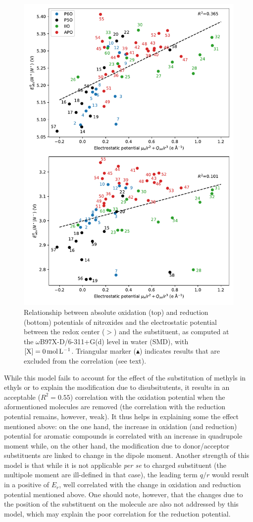 \documentclass[review]{elsarticle}
\begin{document}
\begin{figure}[!h]
\centering
\includegraphics[width=.9\linewidth]{Figure6}
\caption{Relationship between absolute oxidation (top) and reduction (bottom) potentials of nitroxides and the electrostatic potential between the redox center ($>$) and the substituent, as computed at the $\omega$B97X-D/6-311+G(d) level in water (SMD), with $[\ce{X}]=\SI{0}{\mole\per\liter}$. Triangular marker ($\blacktriangle$) indicates results that are excluded from the correlation (see text).}
\label{fig:corr} 
\end{figure}

While this model fails to account for the effect of the substitution of methyls in ethyls  or to explain the modification due to disubsitutents, it results in an acceptable ($R^2 = 0.55$) correlation with the oxidation potential when the aformentioned molecules are removed (the correlation with the reduction potential remains, however, weak). It thus helps in explaining some the effect mentioned above: on the one hand, the increase in oxidation (and reduction) potential for aromatic compounds is correlated with an increase in quadrupole moment while, on the other hand, the modification due to donor/acceptor substituents are linked to change in the dipole moment. Another strength of this model is that while it is not applicable \textit{per se} to charged substituent (the multipole moment are ill-defined in that case), the leading term $q/r$ would result in a positive of $E_r$, well correlated with the change in oxidation and reduction potential mentioned above. One should note, however, that the changes due to the position of the substituent on the molecule are also not addressed by this model, which may explain the poor correlation for the reduction potential.
\end{document}
